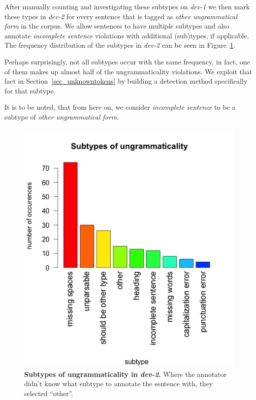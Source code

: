 \documentclass[a4paper,10pt]{scrartcl}
\theoremstyle{style}
\begin{document}
After manually counting and investigating these subtypes on \textit{dev-1} we then mark these types in \textit{dev-2} for every sentence that is tagged as \textit{other ungrammatical form} in the corpus. We allow sentences to have multiple subtypes and also annotate \textit{incomplete sentence} violations with additional (sub)types, if applicable. The frequency distribution of the subtypes in \textit{dev-2} can be seen in Figure~\ref{subtypes}.

Perhaps surprisingly, not all subtypes occur with the same frequency, in fact, one of them makes up almost half of the ungrammaticality violations. We exploit that fact in Section~\ref{sec_unknowntokens} by building a detection method specifically for that subtype.

It is to be noted, that from here on, we consider \textit{incomplete sentence} to be a subtype of \textit{other ungrammatical form}.

\begin{figure}
\begin{center}
\includegraphics[scale=0.6]{subtypes_dev2.png}
\end{center}
\caption{\textbf{Subtypes of ungrammaticality in \textit{dev-2}.} Where the annotator didn't know what subtype to annotate the sentence with, they selected ``other''.}
\label{subtypes}
\end{figure}
\end{document}
